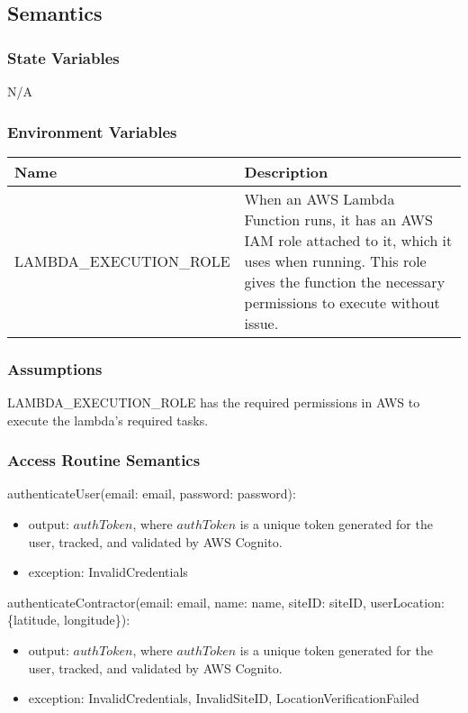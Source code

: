 \documentclass[12pt, titlepage]{article}
\begin{document}
\subsection{Semantics}

\subsubsection{State Variables}

N/A

\subsubsection{Environment Variables}

\begin{center}
  \begin{tabular}{p{6cm} p{10cm}}
    \hline
    \textbf{Name} & \textbf{Description} \\
    \hline
    LAMBDA\_EXECUTION\_ROLE & When an AWS Lambda Function runs, it
    has an AWS IAM role attached to it, which it uses when running.
    This role gives the function the necessary permissions to execute
    without issue. \\
    \hline
  \end{tabular}
\end{center}

\subsubsection{Assumptions}

LAMBDA\_EXECUTION\_ROLE has the required permissions in AWS to
execute the lambda's required tasks.

\subsubsection{Access Routine Semantics}

\noindent authenticateUser(email: email, password: password):
\begin{itemize}
  \item output: $authToken$, where $authToken$ is a unique token
    generated for the user, tracked, and validated by AWS Cognito.
  \item exception: InvalidCredentials
\end{itemize}

\noindent authenticateContractor(email: email, name: name, siteID:
siteID, userLocation: \{latitude, longitude\}):
\begin{itemize}
  \item output: $authToken$, where $authToken$ is a unique token
    generated for the user, tracked, and validated by AWS Cognito.
  \item exception: InvalidCredentials, InvalidSiteID, LocationVerificationFailed
\end{itemize}
\end{document}
